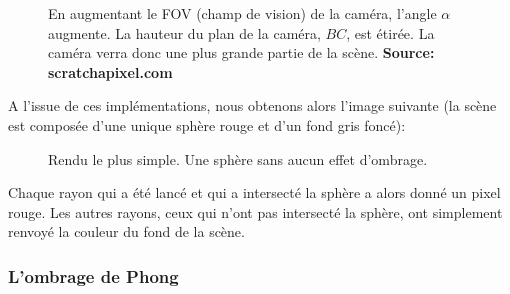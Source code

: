 \documentclass[11pt]{article}
\begin{document}
\begin{figure}[h!]

	\caption{En augmentant le FOV (champ de vision) de la caméra, l'angle $\alpha$ augmente. La hauteur du plan de la caméra, $BC$, est étirée. La caméra verra donc une plus grande partie de la scène. \textbf{Source: scratchapixel.com}}
	\label{fovCam}
\end{figure}
\FloatBarrier

A l'issue de ces implémentations, nous obtenons alors l'image suivante (la scène est composée d'une unique sphère rouge et d'un fond gris foncé):

\begin{figure}[h!]

	\caption{Rendu le plus simple. Une sphère sans aucun effet d'ombrage.}
	\label{basicRender}
\end{figure}
\FloatBarrier

Chaque rayon qui a été lancé et qui a intersecté la sphère a alors donné un pixel rouge. Les autres rayons, ceux qui n'ont pas intersecté la sphère, ont simplement renvoyé la couleur du fond de la scène. 

\subsubsection{L'ombrage de Phong}
\label{ombragePhong}
\end{document}
